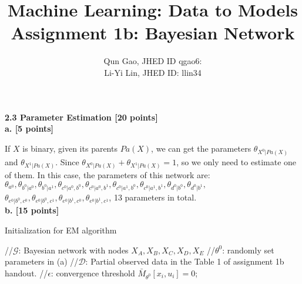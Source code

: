 \documentclass[letterpaper, 11pt]{article}
\title{Machine Learning: Data to Models \\Assignment 1b: Bayesian Network}
\author{Qun Gao, JHED ID qgao6: \\Li-Yi Lin, JHED ID: llin34}
\date{}
\begin{document}
\maketitle

\noindent \LARGE \textbf{2.3 Parameter Estimation [20 points]}\\
\Large \textbf{a. [5 points]}
\large

If $X$ is binary, given its parents $Pa(X)$, we can get the parameters $\theta_{X^0|Pa(X)}$ and $\theta_{X^1|Pa(X)}$. Since $\theta_{X^0|Pa(X)} + \theta_{X^1|Pa(X)} = 1$, so we only need to estimate one of them. In this case, the parameters of this network are: $\theta_{a^0},\theta_{b^0|a^0}, \theta_{b^0|a^1}, \theta_{c^0|a^0, b^0}, \theta_{c^0|a^0, b^1}, \theta_{c^0|a^1, b^0}, \theta_{c^0|a^1, b^1}, \theta_{d^0|b^0}, \theta_{d^0|b^1}, $ \\
$\theta_{e^0|b^0, c^0}, \theta_{e^0|b^0, c^1}, \theta_{e^0|b^1, c^0}, \theta_{e^0|b^1, c^1}$, 13 parameters in total.\\

\noindent
\large \textbf{b. [15 points]}

\begin{algorithm}
\caption{Initialization for EM algorithm}
\begin{algorithmic}[1]

\State //$\mathcal{G}$: Bayesian network with nodes $X_A, X_B, X_C, X_D, X_E$
\State //$\theta^0$: randomly set parameters in (a)
\State//$\mathcal{D}$: Partial observed data in the Table 1 of assignment 1b handout.
\State //$\epsilon$: convergence threshold
        \State $\bar{M}_{\theta^0}[x_i, u_i] = 0$;
    \EndFor
\EndFor
\EndProcedure
\end{algorithmic}
\end{algorithm}
\end{document}
